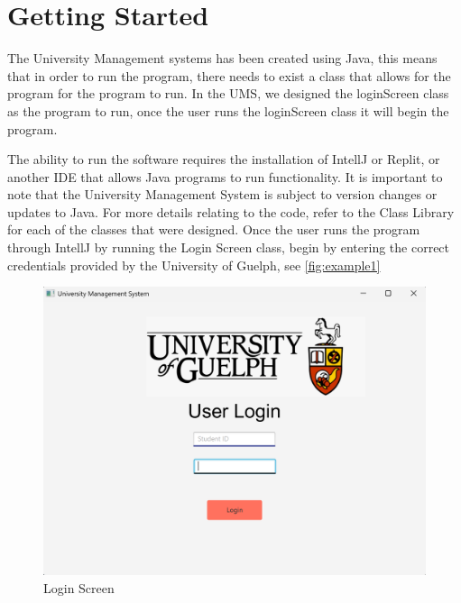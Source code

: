 \newpage
\section{Getting Started}
The University Management systems has been created using Java, this means that in order to run the program, there needs to exist a class that allows for the program for the program to run. In the UMS, we designed the loginScreen class as the program to run, once the user runs the loginScreen class it will begin the program.

The ability to run the software requires the installation of IntellJ or Replit, or another IDE that allows Java programs to run functionality. It is important to note that the University Management System is subject to version changes or updates to Java. For more details relating to the code, refer to the Class Library for each of the classes that were designed. Once the user runs the program through IntellJ by running the Login Screen class, begin by entering the correct credentials provided by the University of Guelph, see \autoref{fig:example1}


\begin{figure}[ht]
    \centering
        \centering\includegraphics[width=1\linewidth]{figures/login_screen.png}
        \caption{Login Screen}
        \label{fig:example1}  
\end{figure}




